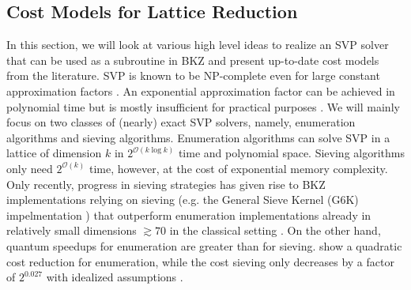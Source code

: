 




\subsection{Cost Models for Lattice Reduction} \label{sec:costmodels}
In this section, we will look at various high level ideas to realize an SVP solver that can be used as a subroutine in BKZ and present up-to-date cost models from the literature. SVP is known to be NP-complete even for large constant approximation factors \cite{Ajt98, Khot05}. An exponential approximation factor can be achieved in polynomial time but is mostly insufficient for practical purposes \cite{LLL82}.  We will mainly focus on two classes of (nearly) exact SVP solvers, namely, enumeration algorithms and sieving algorithms. Enumeration algorithms can solve SVP in a lattice of dimension $k$ in $2^{\mathcal{O}(k \log k)}$ time and polynomial space. Sieving algorithms only need $2^{\mathcal{O}(k)}$ time, however, at the cost of exponential memory complexity. Only recently, progress in sieving strategies has given rise to BKZ implementations relying on sieving (e.g. the General Sieve Kernel (G6K) impelmentation \cite{ADHKPS19, DSW21}) that outperform enumeration implementations already in relatively small dimensions $\gtrsim 70$ in the classical setting \cite{ABLR21}. On the other hand, quantum speedups for enumeration are greater than for sieving. \citet{ANS18} show a quadratic cost reduction for enumeration, while the cost sieving only decreases by a factor of $2^0.027$ with idealized assumptions \cite{Laa15}. %


